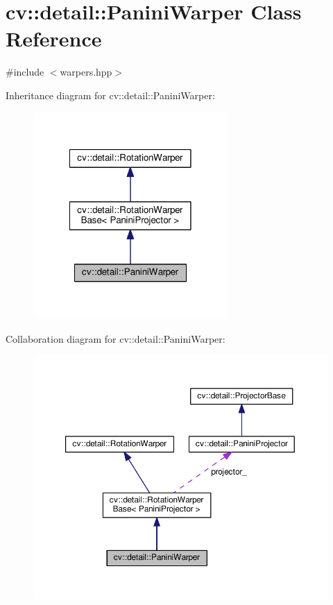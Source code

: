 \hypertarget{classcv_1_1detail_1_1PaniniWarper}{\section{cv\-:\-:detail\-:\-:Panini\-Warper Class Reference}
\label{classcv_1_1detail_1_1PaniniWarper}
}


{\ttfamily \#include $<$warpers.\-hpp$>$}



Inheritance diagram for cv\-:\-:detail\-:\-:Panini\-Warper\-:\nopagebreak
\begin{figure}[H]
\begin{center}
\leavevmode
\includegraphics[width=210pt]{classcv_1_1detail_1_1PaniniWarper__inherit__graph}
\end{center}
\end{figure}


Collaboration diagram for cv\-:\-:detail\-:\-:Panini\-Warper\-:\nopagebreak
\begin{figure}[H]
\begin{center}
\leavevmode
\includegraphics[width=350pt]{classcv_1_1detail_1_1PaniniWarper__coll__graph}
\end{center}
\end{figure}
